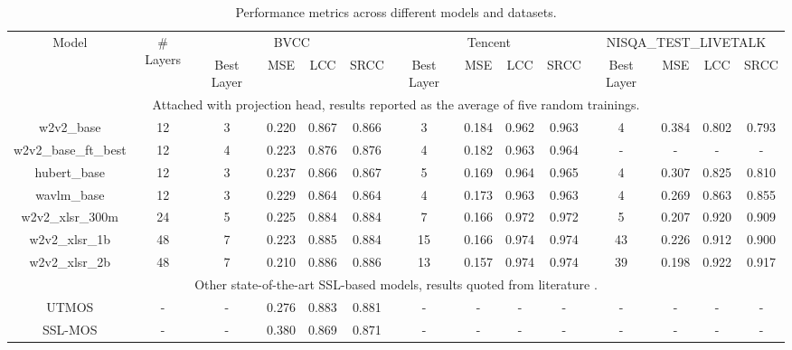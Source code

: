 \documentclass[conference]{IEEEtran}
\begin{document}
\begin{table}[h!]
    \centering
    \begin{adjustbox}{width=\textwidth}
    \begin{tabular}{|c|c|c|ccc|c|ccc|c|ccc|}
        \hline
        \multirow{2}{*}{Model} & \multirow{2}{*}{\# Layers} & \multicolumn{4}{c|}{BVCC} & \multicolumn{4}{c|}{Tencent} & \multicolumn{4}{c|}{NISQA\_TEST\_LIVETALK} \\
        \cline{3-14}
        & & Best Layer & MSE & LCC & SRCC & Best Layer & MSE & LCC & SRCC & Best Layer & MSE & LCC & SRCC \\
        \hline
        \multicolumn{14}{|c|}{Attached with projection head, results reported as the average of five random trainings.} \\
        \hline
        w2v2\_base & 12 & 3 & 0.220 & 0.867 & 0.866 & 3 & 0.184 & 0.962 & 0.963 & 4 & 0.384 & 0.802 & 0.793 \\
        w2v2\_base\_ft\_best & 12 & 4 & 0.223 & 0.876 & 0.876 & 4 & 0.182 & 0.963 & 0.964 & - & - & - & - \\
        hubert\_base & 12 & 3 & 0.237 & 0.866 & 0.867 & 5 & 0.169 & 0.964 & 0.965 & 4 & 0.307 & 0.825 & 0.810 \\
        wavlm\_base & 12 & 3 & 0.229 & 0.864 & 0.864 & 4 & 0.173 & 0.963 & 0.963 & 4 & 0.269 & 0.863 & 0.855 \\
        w2v2\_xlsr\_300m & 24 & 5 & 0.225 & 0.884 & 0.884 & 7 & 0.166 & 0.972 & 0.972 & 5 & 0.207 & 0.920 & 0.909 \\
        w2v2\_xlsr\_1b & 48 & 7 & 0.223 & 0.885 & 0.884 & 15 & 0.166 & 0.974 & 0.974 & 43 & 0.226 & 0.912 & 0.900 \\
        w2v2\_xlsr\_2b & 48 & 7 & 0.210 & 0.886 & 0.886 & 13 & 0.157 & 0.974 & 0.974 & 39 & 0.198 & 0.922 & 0.917 \\
        \hline
        \multicolumn{14}{|c|}{Other state-of-the-art SSL-based models, results quoted from literature \cite{UTMOS}.} \\
        \hline
        UTMOS & - & - & 0.276 & 0.883 & 0.881 & - & - & - & - & - & - & - & - \\
        SSL-MOS \cite{SSL-MOS} & - & - & 0.380 & 0.869 & 0.871 & - & - & - & - & - & - & - & - \\
        \hline
    \end{tabular}
    \end{adjustbox}
    \caption{Performance metrics across different models and datasets.}
    \label{tab:model_results}
\end{table}
\end{document}
